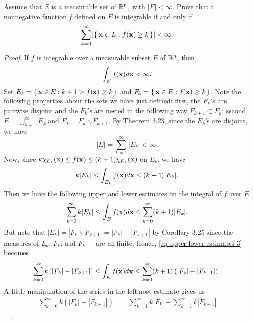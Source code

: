 \begin{problem}
Assume that $E$ is a measurable set of $\mathbb{R}^n$, with
$|E|<\infty$. Prove that a nonnegative function $f$ defined
on $E$ is integrable if and only if
\[
\sum_{k=0}^\infty\left|\left\{\,\mathbf{x}\in E:f(\mathbf{x})\geq
    k\,\right\}\right|<\infty.
\]
\end{problem}
\begin{proof}
If $f$ is integrable over a measurable subset $E$ of $\mathbb{R}^n$, then
\begin{equation}
\label{eq:integrability-3}
\int_E f(\mathbf{x}) d \mathbf{x}<\infty.
\end{equation}
Set $E_k=\left\{\,\mathbf{x}\in E:k+1>f(\mathbf{x})\geq k\,\right\}$ and
$F_k=\left\{\,\mathbf{x}\in E:f(\mathbf{x})\geq k\,\right\}$. Note the
following properties about the sets we have just defined: first, the
$E_k$'s are pairwise disjoint and the $F_k$'s are nested in the following
way $F_{k+1}\subset F_k$; second, $E=\bigcup_{k=1}^\infty E_k$ and
$E_k=F_k\smallsetminus F_{k+1}$. By Theorem 3.23, since the $E_k$'s are disjoint,
we have
\begin{equation}
  \label{eq:disjoint-measurable-sets-3}
|E|=\sum_{k=1}^\infty|E_k|<\infty.
\end{equation}
Now, since $k\chi_{E_k}(\mathbf{x})\leq f(\mathbf{x})\leq (k+1)\chi_{E_k}(\mathbf{x})$ on
$E_k$, we have
\begin{equation}
\label{eq:estimates-E-k-3}
k|E_k|\leq\int_{E_k}f(\mathbf{x}) d \mathbf{x}\leq (k+1)|E_k|.
\end{equation}
Then we have the following upper and lower estimates on the integral of $f$
over $E$
\begin{equation}
\label{eq:upper-lower-estimates-3}
\sum_{k=0}^\infty k|E_k|\leq\int_E f(\mathbf{x}) d \mathbf{x}\leq\sum_{k=0}^\infty(k+1)|E_k|.
\end{equation}
But note that $|E_k|=|F_k\smallsetminus F_{k+1}|=|F_k|-|F_{k+1}|$ by Corollary 3.25
since the measures of $E_k$, $F_k$, and $F_{k+1}$ are all finite. Hence,
\eqref{eq:upper-lower-estimates-3} becomes
\begin{equation}
\label{eq:new-upper-lower-estimates-3}
\sum_{k=0}^\infty k\left(|F_k|-|F_{k+1}|\right)\leq
\int_E f(\mathbf{x}) d \mathbf{x}\leq
\sum_{k=0}^\infty (k+1)\left(|F_k|-|F_{k+1}|\right).
\end{equation}
A little manipulation of the series in the leftmost estimate gives us
\begin{equation}
\label{eq:leftmost-estimate-3}
\begin{aligned}
\sum_{k=0}^\infty k\left(|F_k|-|F_{k+1}|\right)
={}&\sum_{k=1}^\infty k|F_k|-\sum_{k=1}^\infty k|F_{k+1}|\\

\end{aligned}
\end{equation}
\end{proof}
